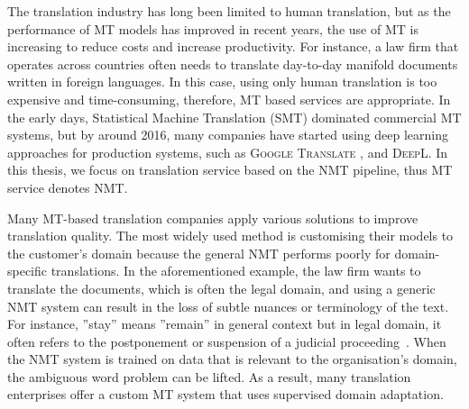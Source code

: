 The translation industry has long been limited to human translation, but as the performance of MT models has improved in recent years, the use of MT is increasing to reduce costs and increase productivity. For instance, a law firm that operates across countries often needs to translate day-to-day manifold documents written in foreign languages. In this case, using only human translation is too expensive and time-consuming, therefore, MT based services are appropriate.
In the early days, Statistical Machine Translation (SMT) dominated commercial MT systems, but by around 2016, many companies have started using deep learning approaches for production systems, such as \textsc{Google Translate} \parencite[]{zhang-etal-2019-bridging}, and \textsc{DeepL}. In this thesis, we focus on translation service based on the NMT pipeline, thus MT service denotes NMT. 

Many MT-based translation companies apply various solutions to improve translation quality. The most widely used method is customising their models to the customer's domain because the general NMT performs poorly for domain-specific translations. %
In the aforementioned example, the law firm wants to translate the documents, which is often the legal domain, and using a generic NMT system can result in the loss of subtle nuances or terminology of the text. For instance, ''stay'' means ''remain'' in general context but in legal domain, it often refers to the postponement or suspension of a judicial proceeding~\parencite[]{Encyclopedia}. When the NMT system is trained on data that is relevant to the organisation's domain, the ambiguous word problem can be lifted. As a result, many translation enterprises offer a custom MT system that uses supervised domain adaptation. 

